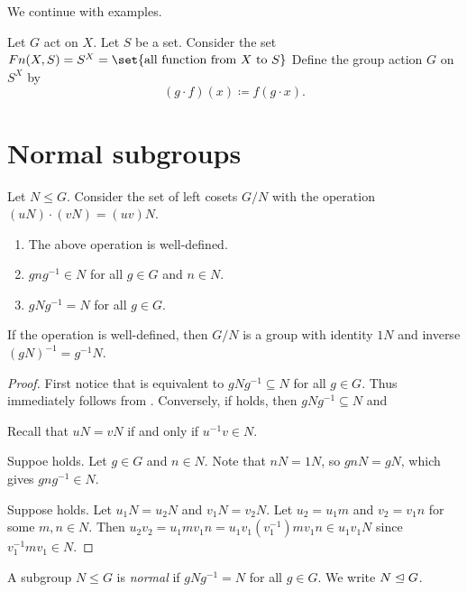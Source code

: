 We continue with examples.
\begin{examples}
    \item Let $G$ act on $X$.
    Let $S$ be a set.
    Consider the set $Fn(X, S) = S^X = \set{\text{all function from } X
    \text{ to } S}$
    Define the group action $G$ on $S^X$ by \[
        (g \cdot f)(x) \coloneq f(g \cdot x).
    \]
\end{examples}

\section{Normal subgroups} \label{sec:normal}
\begin{proposition} \label{thm:normal}
    Let $N \le G$.
    Consider the set of left cosets $G/N$ with the operation
    $(uN) \cdot (vN) = (uv)N$.
    \begin{enumerate}
        \item \label{thm:normal:well}
            The above operation is well-defined.
        \item \label{thm:normal:in}
            $gng^{-1} \in N$ for all $g \in G$ and $n \in N$.
        \item \label{thm:normal:equals}
            $gNg^{-1} = N$ for all $g \in G$.
    \end{enumerate}
    If the operation is well-defined, then $G/N$ is a group
    with identity $1N$ and inverse $(gN)^{-1} = g^{-1}N$.
\end{proposition}
\begin{proof}
    First notice that  is equivalent to
    $gNg^{-1} \subseteq N$ for all $g \in G$.
    Thus  immediately follows from
    .
    Conversely, if  holds, then
    $gNg^{-1} \subseteq N$ and

    Recall that $uN = vN$ if and only if $u^{-1}v \in N$.

    Suppoe  holds.
    Let $g \in G$ and $n \in N$.
    Note that $nN = 1N$, so $gnN = gN$, which gives $gng^{-1} \in N$.

    Suppose  holds.
    Let $u_1N = u_2N$ and $v_1N = v_2N$.
    Let $u_2 = u_1 m$ and $v_2 = v_1 n$ for some $m, n \in N$.
    Then $u_2v_2 = u_1mv_1n = u_1v_1(v_1^{-1})mv_1n \in u_1v_1 N$
    since $v_1^{-1}mv_1 \in N$.
\end{proof}

\begin{definition} \label{def:normal}
    A subgroup $N \le G$ is \emph{normal} if $gNg^{-1} = N$
    for all $g \in G$.
    We write $N \trianglelefteq G$.
\end{definition}

